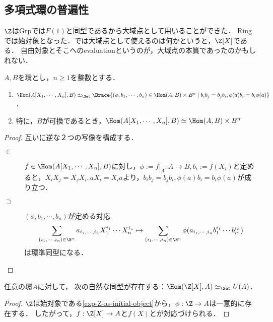 \documentclass[uplatex,dvipdfmx]{jsreport}
\begin{document}
\subsection{多項式環の普遍性}

\begin{tcolorbox}[colframe=ForestGreen, colback=ForestGreen!10!white,breakable,colbacktitle=ForestGreen!40!white,coltitle=black,fonttitle=\bfseries\sffamily,
title=]
    $\Z$はGrpでは$F(1)$と同型であるから大域点として用いることができた．
    Ringでは始対象となった．では大域点として使えるのは何かというと，$\Z[X]$である．
    自由対象とそこへのevaluationというのが，大域点の本質であったのかもしれない．
\end{tcolorbox}

\begin{proposition}[多項式環からの準同型]
    $A,B$を環とし，$n\ge 1$を整数とする．
    \begin{enumerate}
        \item $\Hom(A[X_1,\cdots,X_n],B)\simeq_\Set\Brace{(\phi,b_1,\cdots,b_n)\in\Hom(A,B)\times B^n\mid b_ib_j=b_jb_i,\phi(a)b_i=b_i\phi(a)}$．
        \item 特に，$B$が可換であるとき，$\Hom(A[X_1,\cdots,X_n],B)\simeq\Hom(A,B)\times B^n$
    \end{enumerate}
\end{proposition}
\begin{proof}
    互いに逆な２つの写像を構成する．
    \begin{description}
        \item[$\subset$] $f\in\Hom(A[X_1,\cdots,X_n],B)$に対し，$\phi:=f|_A:A\to B,b_i:=f(X_i)$と定めると，$X_iX_j=X_jX_i,aX_i=X_ia$より，$b_ib_j=b_jb_i,\phi(a)b_i=b_i\phi(a)$が成り立つ．
        \item[$\supset$] $(\phi,b_1,\cdots,b_n)$が定める対応
        \[\sum_{(i_1,\cdots,i_n)\in\N^n}a_{i_1,\cdots,i_n}X_1^{i_1}\cdots X_n^{i_n}\mapsto\sum_{(i_1,\cdots,i_n)\in\N^n}\phi(a_{i_1,\cdots,i_n}b_1^{i_1}\cdots b_n^{i_n})\]
        は環準同型になる．
    \end{description}
\end{proof}

\begin{corollary}[ある種のevaluation]\label{cor-Zx-as-global-point}
    任意の環$A$に対して，
    次の自然な同型が存在する：$\Hom(\Z[X],A)\simeq_\Set U(A)$．
\end{corollary}
\begin{proof}
    $\Z$は始対象である\ref{exp-Z-as-initial-object}から，$\phi:\Z\to A$は一意的に存在する．
    したがって，$f:\Z[X]\to A$と$f(X)$とが対応づけられる．
\end{proof}
\end{document}
